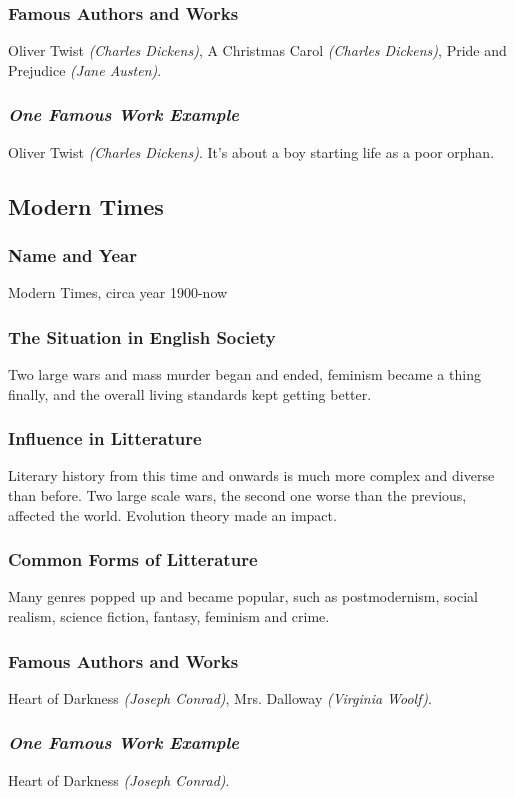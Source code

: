 \subsubsection{Famous Authors and Works}
Oliver Twist \textit{(Charles Dickens)}, A Christmas Carol \textit{(Charles Dickens)}, Pride and Prejudice \textit{(Jane Austen)}.

\subsubsection{\textit{One Famous Work Example}}
Oliver Twist \textit{(Charles Dickens)}. It's about a boy starting life as a poor orphan.

\newpage
\subsection{Modern Times}

\subsubsection{Name and Year}
Modern Times, circa year 1900-now

\subsubsection{The Situation in English Society}
Two large wars and mass murder began and ended, feminism became a thing finally, and the overall living standards kept getting better.

\subsubsection{Influence in Litterature}
Literary history from this time and onwards is much more complex and diverse than before. Two large scale wars, the second one worse than the previous, affected the world. Evolution theory made an impact.

\subsubsection{Common Forms of Litterature}
Many genres popped up and became popular, such as postmodernism, social realism, science fiction, fantasy, feminism and crime.

\subsubsection{Famous Authors and Works}
Heart of Darkness \textit{(Joseph Conrad)}, Mrs. Dalloway \textit{(Virginia Woolf)}.

\subsubsection{\textit{One Famous Work Example}}
Heart of Darkness \textit{(Joseph Conrad)}.










